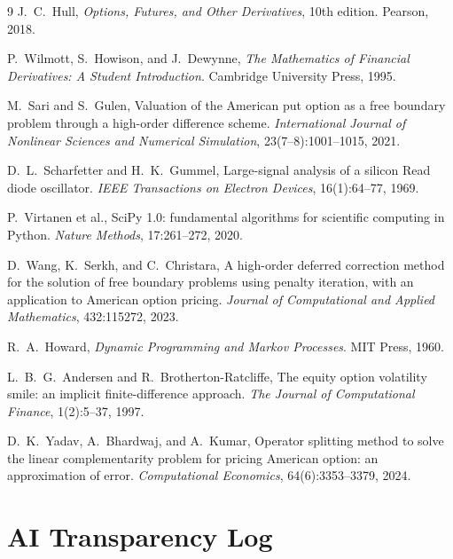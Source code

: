 \documentclass[11pt,a4paper]{article}
\theoremstyle{definition}
\theoremstyle{remark}
\begin{document}
\newpage
\begin{thebibliography}{9}
 J.~C.~Hull, \emph{Options, Futures, and Other Derivatives},
10th edition. Pearson, 2018.

 P.~Wilmott, S.~Howison, and J.~Dewynne,
\emph{The Mathematics of Financial Derivatives: A Student Introduction}.
Cambridge University Press, 1995.

 M.~Sari and S.~Gulen, Valuation of the American put option
as a free boundary problem through a high-order difference scheme.
\emph{International Journal of Nonlinear Sciences and Numerical
Simulation}, 23(7--8):1001--1015, 2021.

 D.~L.~Scharfetter and H.~K.~Gummel, Large-signal analysis of
a silicon Read diode oscillator. \emph{IEEE Transactions on Electron
Devices}, 16(1):64--77, 1969.

 P.~Virtanen et al., SciPy 1.0: fundamental algorithms for
scientific computing in Python. \emph{Nature Methods}, 17:261--272, 2020.

 D.~Wang, K.~Serkh, and C.~Christara, A high-order deferred
correction method for the solution of free boundary problems using penalty
iteration, with an application to American option pricing.
\emph{Journal of Computational and Applied Mathematics},
432:115272, 2023.

 R.~A.~Howard, \emph{Dynamic Programming and Markov
Processes}. MIT Press, 1960.

 L.~B.~G.~Andersen and R.~Brotherton-Ratcliffe, The equity
option volatility smile: an implicit finite-difference approach.
\emph{The Journal of Computational Finance}, 1(2):5--37, 1997.

 D.~K.~Yadav, A.~Bhardwaj, and A.~Kumar, Operator splitting
method to solve the linear complementarity problem for pricing American
option: an approximation of error. \emph{Computational Economics},
64(6):3353--3379, 2024.
\end{thebibliography}

\newpage
\appendix
\section{AI Transparency Log}
\label{app:ai}
\end{document}
